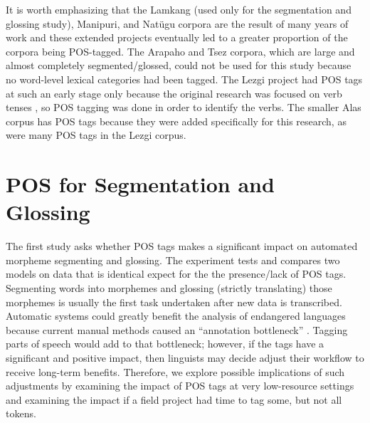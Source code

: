 It is worth emphasizing that the Lamkang (used only for the segmentation and glossing study), Manipuri, and Nat\"ugu corpora are the result of many years of work and these extended projects eventually led to a greater proportion of the corpora being POS-tagged. The Arapaho and Tsez corpora, which are large and almost completely segmented/glossed, could not be used for this study because no word-level lexical categories had been tagged. The Lezgi project had POS tags at such an early stage only because the original research was focused on verb tenses \citep{donet_importance_2014}, so POS tagging was done in order to identify the verbs. The smaller Alas corpus has POS tags because they were added specifically for this research, as were many POS tags in the Lezgi corpus.




\section{POS for Segmentation and Glossing}
\label{sec:seggls}

The first study asks whether POS tags makes a significant impact on automated morpheme segmenting and glossing. The experiment tests and compares two models on data that is identical expect for the the presence/lack of POS tags. Segmenting words into morphemes and glossing (strictly translating) those morphemes is usually the first task undertaken after new data is transcribed. Automatic systems could greatly benefit the analysis of endangered languages because current manual methods caused an ``annotation bottleneck'' \citep{simons_worlds_2013,holton_developing_2017,seifart_language_2018}. Tagging parts of speech would add to that bottleneck; however, if the tags have a significant and positive impact, then linguists may decide adjust their workflow to receive long-term benefits. Therefore, we explore possible implications of such adjustments by examining the impact of POS tags at very low-resource settings and examining the impact if a field project had time to tag some, but not all tokens. 

